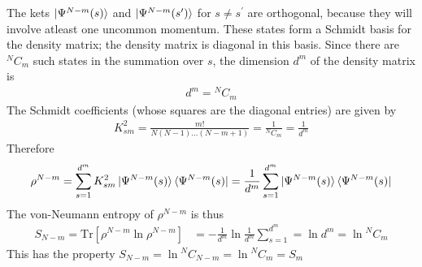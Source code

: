 \documentclass[12pt,twoside]{article}
\numberwithin{equation}{section}
\begin{document}
{The kets \(\ket{\Psi^{N-m}(s)}\) and \(\ket{\Psi^{N-m}(s^\prime)}\) for \(s \neq s^\prime\) are orthogonal, because they will involve atleast one uncommon momentum. These states form a Schmidt basis for the density matrix; the density matrix is diagonal in this basis. Since there are \({}^NC_m\) such states in the summation over \(s\), the dimension \(d^m\) of the density matrix is 
\begin{equation}\begin{aligned}
	d^m = {}^NC_m
\end{aligned}\end{equation}
The Schmidt coefficients (whose squares are the diagonal entries) are given by
\begin{equation}\begin{aligned}
	K^2_{sm} = \frac{m!}{N(N-1)...(N-m+1)} = \frac{1}{{}^NC_m} = \frac{1}{{d^m}}
\end{aligned}\end{equation}
Therefore
\begin{equation}\begin{aligned}
	\rho^{N-m} = \sum_{s=1}^{d^m} K^2_{sm}\ket{\Psi^{N-m}(s)}\bra{\Psi^{N-m}(s)} = \frac{1}{{d^m}}\sum_{s=1}^{d^m}\ket{\Psi^{N-m}(s)}\bra{\Psi^{N-m}(s)}
\end{aligned}\end{equation}
The von-Neumann entropy of \(\rho^{N-m}\) is thus
\begin{equation}\begin{aligned}
	S_{N-m} = \text{Tr}\left[\rho^{N-m} \ln \rho^{N-m}\right] &= - \frac{1}{{d^m}} \ln \frac{1}{{d^m}} \sum_{s=1}^{d^m} = \ln {d^m} = \ln {}^N C_m
\end{aligned}\end{equation}
This has the property \(S_{N-m} = \ln {}^N C_{N-m} = \ln {}^N C_{m} = S_m\)

}
\end{document}
